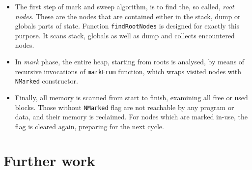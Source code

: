 \documentclass[12pt,a4paper]{report}
\begin{document}
\begin{itemize}
  \item The first step of mark and sweep algorithm, is to find the, so called,
    \textit{root nodes}. These are the nodes that are contained either in the
    stack, dump or globals parts of state. Function \texttt{findRootNodes} is
    designed for exactly this purpose. It scans stack, globals as well as dump
    and collects encountered nodes.
  \item In \textit{mark} phase, the entire heap, starting from roots is
    analysed, by means of recursive invocations of \texttt{markFrom} function,
    which wraps visited nodes with \texttt{NMarked} constructor.
  \item Finally, all memory is scanned from start to finish, examining all free
    or used blocks. Those without \texttt{NMarked} flag are not reachable
    by any program or data, and their memory is reclaimed. For nodes which are
    marked in-use, the flag is cleared again, preparing for the next
    cycle.
\end{itemize}


\chapter{Further work}



\end{document}
